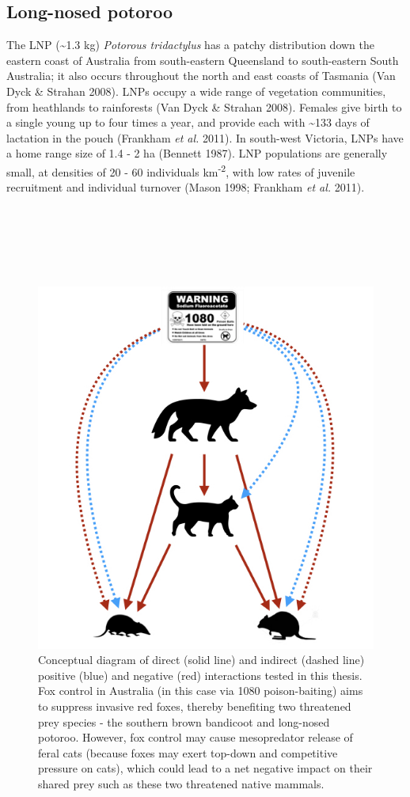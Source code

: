 \documentclass[11pt,a4paper,titlepage,twoside,openright]{style/unimelbthesis}
\begin{document}
\begin{mainmatter}
\hypertarget{long-nosed-potoroo}{%
\subsection{Long-nosed potoroo}\label{long-nosed-potoroo}}

The LNP (\textasciitilde1.3 kg) \emph{Potorous tridactylus} has a patchy distribution down the eastern coast of Australia from south-eastern Queensland to south-eastern South Australia; it also occurs throughout the north and east coasts of Tasmania (Van Dyck \& Strahan 2008). LNPs occupy a wide range of vegetation communities, from heathlands to rainforests (Van Dyck \& Strahan 2008). Females give birth to a single young up to four times a year, and provide each with \textasciitilde133 days of lactation in the pouch (Frankham \emph{et al.} 2011). In south-west Victoria, LNPs have a home range size of 1.4 - 2 ha (Bennett 1987). LNP populations are generally small, at densities of 20 - 60 individuals km\textsuperscript{-2}, with low rates of juvenile recruitment and individual turnover (Mason 1998; Frankham \emph{et al.} 2011).

\newpage

\(~\)

\(~\)

\(~\)
\begin{figure}

{\centering \includegraphics[width=0.7\linewidth]{figure/conceptual_diagram} 

}

\caption{Conceptual diagram of direct (solid line) and indirect (dashed line) positive (blue) and negative (red) interactions tested in this thesis. Fox control in Australia (in this case via 1080 poison-baiting) aims to suppress invasive red foxes, thereby benefiting two threatened prey species - the southern brown bandicoot and long-nosed potoroo. However, fox control may cause mesopredator release of feral cats (because foxes may exert top-down and competitive pressure on cats), which could lead to a net negative impact on their shared prey such as these two threatened native mammals.}\label{fig:intro-conceptual}
\end{figure}
\hypertarget{otways17}{%
}
\end{mainmatter}
\end{document}
